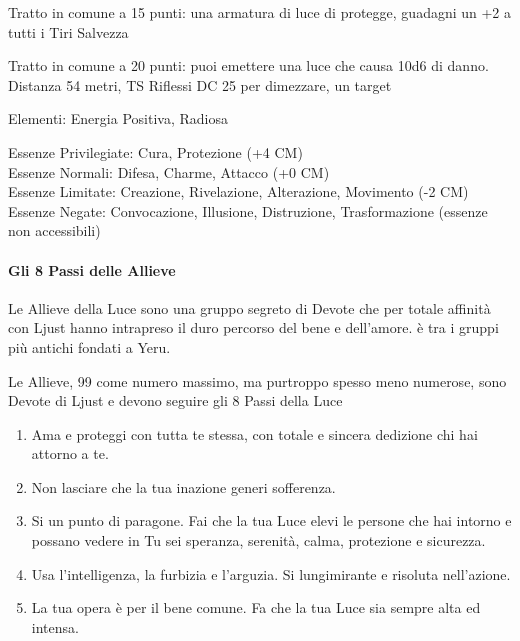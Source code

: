\documentclass[a4paper,11pt,twoside,openany]{book}
\begin{document}
{Tratto in comune a 15 punti: una armatura di luce di protegge, guadagni un +2 a tutti i Tiri Salvezza

Tratto in comune a 20 punti: puoi emettere una luce che causa 10d6 di danno. Distanza 54 metri, TS Riflessi DC 25 per dimezzare, un target

\bigskip

Elementi: Energia Positiva, Radiosa

\bigskip

Essenze Privilegiate: Cura, Protezione (+4 CM)\\
Essenze Normali: Difesa, Charme, Attacco (+0 CM)\\
Essenze Limitate: Creazione, Rivelazione, Alterazione, Movimento (-2 CM)
Essenze Negate: Convocazione, Illusione, Distruzione, Trasformazione (essenze non accessibili)

\paragraph{Gli 8 Passi delle Allieve}

\label{gli-8-passi-delle-allieve}

Le Allieve della Luce sono una gruppo segreto di Devote che per totale affinità con Ljust hanno intrapreso il duro percorso del bene e dell'amore. è tra i gruppi più antichi fondati a Yeru.

Le Allieve, 99 come numero massimo, ma purtroppo spesso meno numerose, sono Devote di Ljust e devono seguire gli 8 Passi della Luce

\begin{enumerate}
	\item Ama e proteggi con tutta te stessa, con totale e sincera dedizione chi hai attorno a te.
	
	\item Non lasciare che la tua inazione generi sofferenza.

	\item Si un punto di paragone. Fai che la tua Luce elevi le persone che hai intorno e possano vedere in Tu sei speranza, serenità, calma, protezione e sicurezza.

	\item Usa l'intelligenza, la furbizia e l'arguzia. Si lungimirante e risoluta nell'azione.

	\item La tua opera è per il bene comune. Fa che la tua Luce sia sempre alta ed intensa.


\end{enumerate}}
\end{document}
